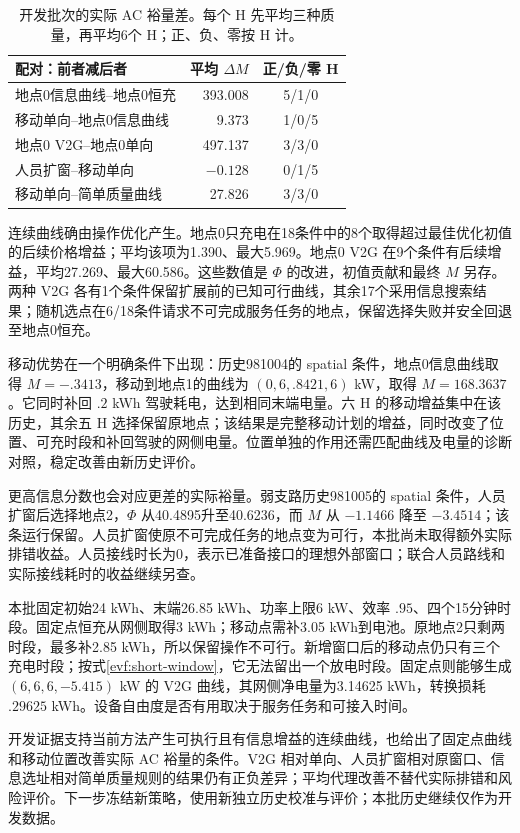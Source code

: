\begin{table}[htbp]
 \centering\small
 \caption{开发批次的实际 AC 裕量差。每个 H 先平均三种质量，再平均6个 H；正、负、零按 H 计。}
 \label{evf:development-pairs}
 \begin{tabular}{lrc}
  \toprule
  配对：前者减后者 & 平均 $\Delta M$ & 正/负/零 H\\
  \midrule
  地点0信息曲线--地点0恒充 & 393.008 & 5/1/0\\
  移动单向--地点0信息曲线 & 9.373 & 1/0/5\\
  地点0 V2G--地点0单向 & 497.137 & 3/3/0\\
  人员扩窗--移动单向 & $-0.128$ & 0/1/5\\
  移动单向--简单质量曲线 & 27.826 & 3/3/0\\
  \bottomrule
 \end{tabular}
\end{table}

连续曲线确由操作优化产生。地点0只充电在18条件中的8个取得超过最佳优化初值的后续价格增益；平均该项为1.390、最大5.969。地点0 V2G 在9个条件有后续增益，平均27.269、最大60.586。这些数值是 $\Phi$ 的改进，初值贡献和最终 $M$ 另存。两种 V2G 各有1个条件保留扩展前的已知可行曲线，其余17个采用信息搜索结果；随机选点在6/18条件请求不可完成服务任务的地点，保留选择失败并安全回退至地点0恒充。

移动优势在一个明确条件下出现：历史981004的 spatial 条件，地点0信息曲线取得 $M=-.3413$，移动到地点1的曲线为 $(0,6,.8421,6)$ kW，取得 $M=168.3637$。它同时补回 $.2$ kWh 驾驶耗电，达到相同末端电量。六 H 的移动增益集中在该历史，其余五 H 选择保留原地点；该结果是完整移动计划的增益，同时改变了位置、可充时段和补回驾驶的网侧电量。位置单独的作用还需匹配曲线及电量的诊断对照，稳定改善由新历史评价。

更高信息分数也会对应更差的实际裕量。弱支路历史981005的 spatial 条件，人员扩窗后选择地点2，$\Phi$ 从40.4895升至40.6236，而 $M$ 从 $-1.1466$ 降至 $-3.4514$；该条运行保留。人员扩窗使原不可完成任务的地点变为可行，本批尚未取得额外实际排错收益。人员接线时长为0，表示已准备接口的理想外部窗口；联合人员路线和实际接线耗时的收益继续另查。

本批固定初始24 kWh、末端26.85 kWh、功率上限6 kW、效率 $.95$、四个15分钟时段。固定点恒充从网侧取得3 kWh；移动点需补3.05 kWh到电池。原地点2只剩两时段，最多补2.85 kWh，所以保留操作不可行。新增窗口后的移动点仍只有三个充电时段；按式\eqref{evf:short-window}，它无法留出一个放电时段。固定点则能够生成 $(6,6,6,-5.415)$ kW 的 V2G 曲线，其网侧净电量为3.14625 kWh，转换损耗 $.29625$ kWh。设备自由度是否有用取决于服务任务和可接入时间。

开发证据支持当前方法产生可执行且有信息增益的连续曲线，也给出了固定点曲线和移动位置改善实际 AC 裕量的条件。V2G 相对单向、人员扩窗相对原窗口、信息选址相对简单质量规则的结果仍有正负差异；平均代理改善不替代实际排错和风险评价。下一步冻结新策略，使用新独立历史校准与评价；本批历史继续仅作为开发数据。
